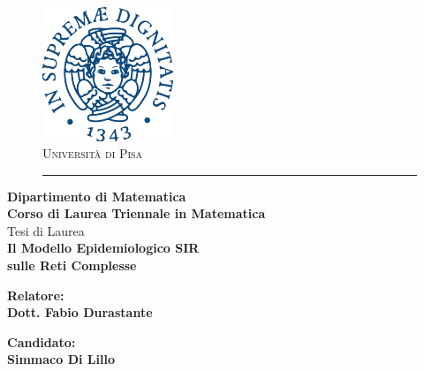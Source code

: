 \documentclass[12pt,a4paper,twoside]{report}
\author{S. Di Lillo}
\begin{document}
\begin{titlepage}
\begin{figure}[t]
	\centering\includegraphics[width=0.35\textwidth]{figure/stemma_unipi.png}\\[1em]
	{\LARGE \textsc{Università di Pisa}}\\
	\vspace*{-0.5em}\rule{0.6\textwidth}{0.4pt}
\end{figure}
\begin{center}
	\textbf{ Dipartimento di Matematica\\ Corso di Laurea Triennale in Matematica \\}
	\vspace{15mm}
	{\centering Tesi di Laurea}\\[1em]
    {\LARGE{\bf Il Modello Epidemiologico SIR \\ sulle Reti Complesse}}\\
	\vspace{3mm}
\end{center}

\vspace{36mm}

\begin{minipage}[t]{0.47\textwidth}
	{\large{\bf Relatore:\\Dott. Fabio Durastante}}
\end{minipage}\hfill\begin{minipage}[t]{0.47\textwidth}\raggedleft
	{\large{\bf Candidato:\\Simmaco Di Lillo\\ }}
\end{minipage}

\vfill
\centering{\rule{0.5\textwidth}{0.4pt}}\\

\end{titlepage}

\begin{abstract}
\cite{KISS}
\end{abstract}
\end{document}
